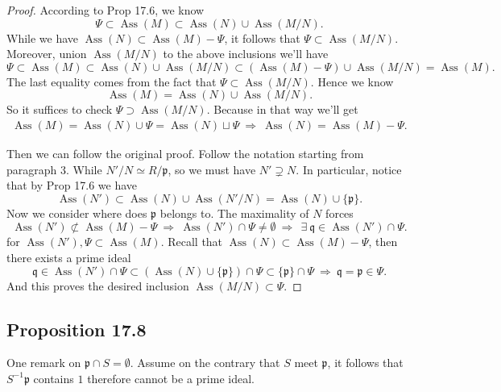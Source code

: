 \begin{proof}
    According to Prop 17.6, we know 
    \[\Psi\subset \operatorname{Ass}(M)\subset \operatorname{Ass}(N)\cup\operatorname{Ass}(M/N).\]
    While we have $\operatorname{Ass}(N)\subset \operatorname{Ass}(M)-\Psi$, it follows that $\Psi\subset \operatorname{Ass}(M/N)$. Moreover, union $\operatorname{Ass}(M/N)$ to the above inclusions we'll have 
    \[\Psi\subset \operatorname{Ass}(M)\subset \operatorname{Ass}(N)\cup\operatorname{Ass}(M/N)\subset (\operatorname{Ass}(M)-\Psi)\cup\operatorname{Ass}(M/N)=\operatorname{Ass}(M).\]
    The last equality comes from the fact that $\Psi\subset \operatorname{Ass}(M/N)$. Hence we know 
    \[\operatorname{Ass}(M)=\operatorname{Ass}(N)\cup \operatorname{Ass}(M/N).\]
    So it suffices to check $\Psi\supset \operatorname{Ass}(M/N)$. Because in that way we'll get 
    \begin{align*}
        \operatorname{Ass}(M)=\operatorname{Ass}(N)\cup \Psi=\operatorname{Ass}(N)\sqcup \Psi ~\Rightarrow~ \operatorname{Ass}(N)=\operatorname{Ass}(M)-\Psi.
    \end{align*}

    Then we can follow the original proof. Follow the notation starting from paragraph 3. While $N'/N\simeq R/\mathfrak p$, so we must have $N'\supsetneq N$.
    In particular, notice that by Prop 17.6 we have 
    \[\operatorname{Ass}(N')\subset \operatorname{Ass}(N)\cup\operatorname{Ass}(N'/N)=\operatorname{Ass}(N)\cup\{\mathfrak p\}.\]
    Now we consider where does $\mathfrak p$ belongs to. 
    The maximality of $N$ forces \[\operatorname{Ass}(N')\not\subset \operatorname{Ass}(M)-\Psi ~\Rightarrow~ \operatorname{Ass}(N')\cap \Psi\neq\emptyset ~\Rightarrow~ ~\exists ~\mathfrak q\in \operatorname{Ass}(N')\cap \Psi.\] for $\operatorname{Ass}(N'),\Psi\subset \operatorname{Ass}(M)$. Recall that $\operatorname{Ass}(N)\subset \operatorname{Ass}(M)-\Psi$, then there exists a prime ideal 
    \[\mathfrak q\in \operatorname{Ass}(N')\cap\Psi\subset (\operatorname{Ass}(N)\cup\{\mathfrak p\})\cap\Psi\subset\{\mathfrak p\}\cap\Psi ~\Rightarrow~ \mathfrak q=\mathfrak p\in\Psi.\]
    And this proves the desired inclusion $\operatorname{Ass}(M/N)\subset \Psi$.

\end{proof}


\subsection{Proposition 17.8}

One remark on $\mathfrak p\cap S=\emptyset$. Assume on the contrary that $S$ meet $\mathfrak p$, it follows that $S^{-1}\mathfrak p$ contains $1$ therefore cannot be a prime ideal.

